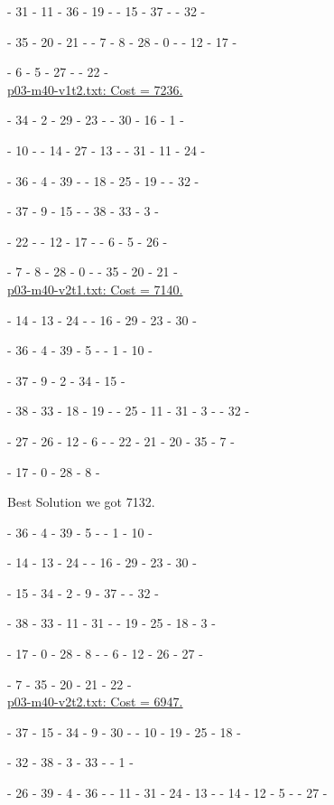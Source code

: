\tc - 31 - 11 - 36 - 19 - \tc - 15 - 37 - \tc - 32 - \tc 

\te - 35 - 20 - 21 - \te - 7 - 8 - 28 - 0 - \te - 12 - 17 - \te 

\te - 6 - 5 - 27 - \te - 22 - \te 
\\ 

\underline{p03-m40-v1t2.txt: Cost = 7236. }

\ta - 34 - 2 - 29 - 23 - \ta - 30 - 16 - 1 - \ta 

\ta - 10 - \ta - 14 - 27 - 13 - \ta - 31 - 11 - 24 - \ta 

\tc - 36 - 4 - 39 - \tc - 18 - 25 - 19 - \tc - 32 - \tc 

\tc - 37 - 9 - 15 - \tc - 38 - 33 - 3 - \tc 

\te - 22 - \te - 12 - 17 - \te - 6 - 5 - 26 - \te 

\te - 7 - 8 - 28 - 0 - \te - 35 - 20 - 21 - \te 
\\ 

\underline{p03-m40-v2t1.txt: Cost = 7140.}

\ta - 14 - 13 - 24 - \ta - 16 - 29 - 23 - 30 - \ta 

\ta - 36 - 4 - 39 - 5 - \ta - 1 - 10 - \ta 

\tc - 37 - 9 - 2 - 34 - 15 - \tc 

\tc - 38 - 33 - 18 - 19 - \tc - 25 - 11 - 31 - 3 - \tc - 32 - \tc 

\te - 27 - 26 - 12 - 6 - \te - 22 - 21 - 20 - 35 - 7 - \te 

\te - 17 - 0 - 28 - 8 - \te  

Best Solution we got  7132.

\ta - 36 - 4 - 39 - 5 - \ta - 1 - 10 - \ta 

\ta - 14 - 13 - 24 - \ta - 16 - 29 - 23 - 30 - \ta 

\tc - 15 - 34 - 2 - 9 - 37 - \tc - 32 - \tc

\tc - 38 - 33 - 11 - 31 - \tc - 19 - 25 - 18 - 3 - \tc

\te - 17 - 0 - 28 - 8 - \te - 6 - 12 - 26 - 27 - \te

\te - 7 - 35 - 20 - 21 - 22 - \te 
\\ 

\underline{p03-m40-v2t2.txt: Cost = 6947. }

\ta - 37 - 15 - 34 - 9 - 30 - \ta - 10 - 19 - 25 - 18 - \ta 

\ta - 32 - 38 - 3 - 33 - \ta - 1 - \ta 

\tb - 26 - 39 - 4 - 36 - \tb - 11 - 31 - 24 - 13 - \tb - 14 - 12 - 5 - \tb - 27 - \tb 

